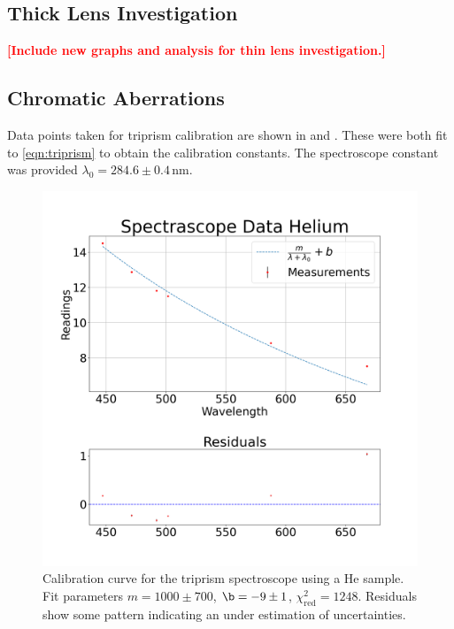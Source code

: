 \documentclass[aip, cp, amsmath, amssymb, reprint, nofootinbib]{revtex4-2}
\begin{document}


        \subsection{Thick Lens Investigation}
            \textcolor{red}{\textbf{[Include new graphs and analysis for thin lens investigation.]}}        

        \subsection{Chromatic Aberrations}

            Data points taken for triprism calibration are shown in  and . These were both fit to \eqref{eqn:triprism} to obtain the calibration constants. The spectroscope constant was provided $\lambda_0 = 284.6 \pm 0.4\,\text{nm}$.

            \begin{figure}[H]
                \centering
                \includegraphics[width=0.9\linewidth]{figures/spec-he.png}
                \caption{Calibration curve for the triprism spectroscope using a $\text{He}$ sample. Fit parameters $m = 1000\pm700$, $\b=-9\pm 1$, $\chi^2_{\text{red}} = 1248$. Residuals show some pattern indicating an under estimation of uncertainties.}
                \label{fig:chromatic-He}
            \end{figure}
\end{document}
